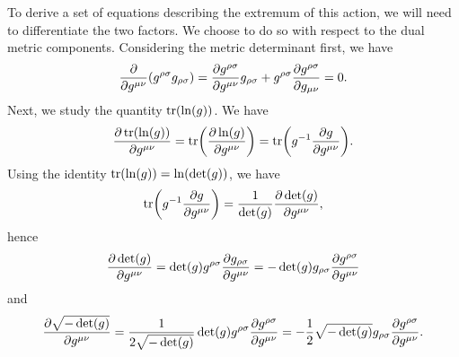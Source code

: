 To derive a set of equations describing the extremum of this action, we will need to differentiate the two factors. We choose to do so with respect to the dual metric components. Considering the metric determinant first, we have
\begin{align*}
	\pdv{g^{\mu\nu}}(g^{\rho\sigma}g_{\rho\sigma}) = \pdv{g^{\rho\sigma}}{g^{\mu\nu}}g_{\rho\sigma} + g^{\rho\sigma}\pdv{g^{\rho\sigma}}{g_{\mu\nu}} = 0.
\end{align*}
Next, we study the quantity $\tr(\ln(g))$. We have
\begin{align*}
	\pdv{\tr(\ln(g))}{g^{\mu\nu}} = \tr(\pdv{\ln(g)}{g^{\mu\nu}}) = \tr(g^{-1}\pdv{g}{g^{\mu\nu}}).
\end{align*}
Using the identity $\tr(\ln(g)) = \ln(\det(g))$, we have
\begin{align*}
	\tr(g^{-1}\pdv{g}{g^{\mu\nu}}) = \frac{1}{\det(g)}\pdv{\det(g)}{g^{\mu\nu}},
\end{align*}
hence
\begin{align*}
	\pdv{\det(g)}{g^{\mu\nu}} = \det(g)g^{\rho\sigma}\pdv{g_{\rho\sigma}}{g^{\mu\nu}} = -\det(g)g_{\rho\sigma}\pdv{g^{\rho\sigma}}{g^{\mu\nu}}
\end{align*}
and
\begin{align*}
	\pdv{\sqrt{-\det(g)}}{g^{\mu\nu}} = \frac{1}{2\sqrt{-\det(g)}}\det(g)g^{\rho\sigma}\pdv{g^{\rho\sigma}}{g^{\mu\nu}} = -\frac{1}{2}\sqrt{-\det(g)}g_{\rho\sigma}\pdv{g^{\rho\sigma}}{g^{\mu\nu}}.
\end{align*}

